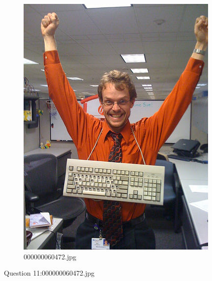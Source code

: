     \begin{figure}[h]
        \centering
        \includegraphics[width=0.8\linewidth]{../image set/easy/000000060472.jpg}
        \caption{000000060472.jpg}
    \end{figure}
    Question 11:000000060472.jpg
